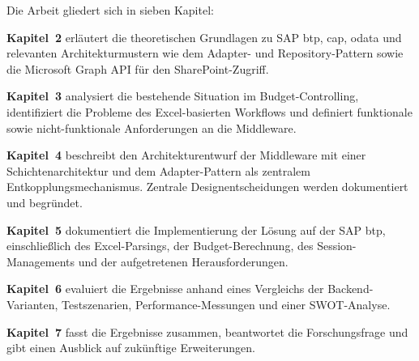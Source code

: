Die Arbeit gliedert sich in sieben Kapitel:

\textbf{Kapitel~2} erläutert die theoretischen Grundlagen zu SAP \gls{btp}, \gls{cap}, \gls{odata} und relevanten Architekturmustern wie dem Adapter- und Repository-Pattern sowie die Microsoft Graph API für den SharePoint-Zugriff.

\textbf{Kapitel~3} analysiert die bestehende Situation im Budget-Controlling, identifiziert die Probleme des Excel-basierten Workflows und definiert funktionale sowie nicht-funktionale Anforderungen an die Middleware.

\textbf{Kapitel~4} beschreibt den Architekturentwurf der Middleware mit einer Schichtenarchitektur und dem Adapter-Pattern als zentralem Entkopplungsmechanismus. Zentrale Designentscheidungen werden dokumentiert und begründet.

\textbf{Kapitel~5} dokumentiert die Implementierung der Lösung auf der SAP \gls{btp}, einschließlich des Excel-Parsings, der Budget-Berechnung, des Session-Managements und der aufgetretenen Herausforderungen.

\textbf{Kapitel~6} evaluiert die Ergebnisse anhand eines Vergleichs der Backend-Varianten, Testszenarien, Performance-Messungen und einer SWOT-Analyse.

\textbf{Kapitel~7} fasst die Ergebnisse zusammen, beantwortet die Forschungsfrage und gibt einen Ausblick auf zukünftige Erweiterungen.
